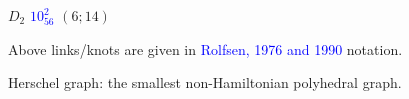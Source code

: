 \documentclass{beamer}
\begin{document}
\begin{frame}
\begin{center}
\begin{minipage}[b]{23mm}
\end{minipage}
\begin{minipage}[b]{23mm}
\centering
{}\par
$D_{2}$ 
\textcolor{blue}{$10^2_{56}$} 
 $(6;14)$
\end{minipage}
\end{center}
Above links/knots  are given in \textcolor{blue}{Rolfsen, 1976 and 1990} 
 notation.

Herschel graph: the smallest non-Hamiltonian polyhedral graph.
\end{frame}
\end{document}
